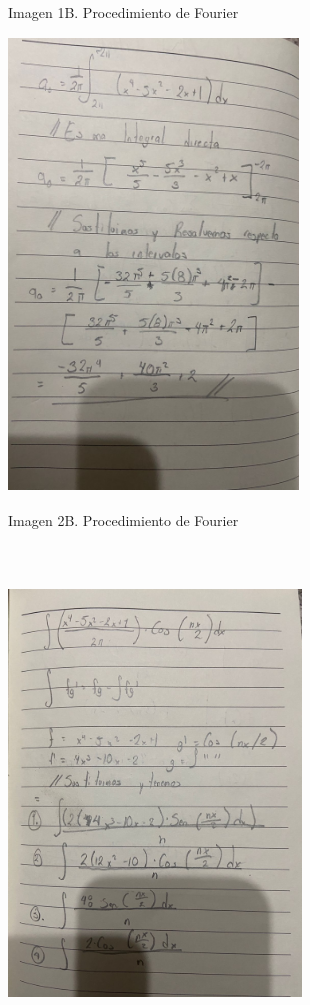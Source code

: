 Imagen 1B. Procedimiento de Fourier

\includegraphics[width=3.03622in,height=4.74409in]{media/image8.jpg}

Imagen 2B. Procedimiento de Fourier

\includegraphics[width=3.0625in,height=5.18146in]{media/image42.jpg}

